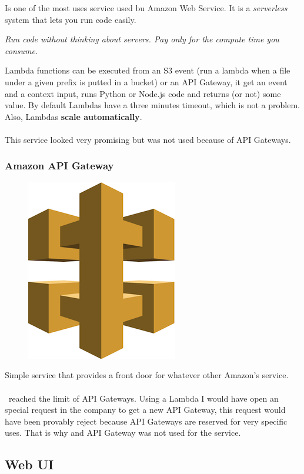 Is one of the most uses service used bu Amazon Web Service. It is a \textit{serverless} system that lets you run code easily.

\begin{displayquote}
\textit{Run code without thinking about servers. Pay only for the compute time you consume.}
\end{displayquote}

Lambda functions can be executed from an S3 event (run a lambda when a file under a given prefix is putted in a bucket) or an API Gateway, it get an event and a context input, runs Python\cite{python} or Node.js\cite{nodejs} code and returns (or not) some value. By default Lambdas have a three minutes timeout, which is not a problem. Also, Lambdas \textbf{scale automatically}.
\\\\
This service looked very promising but was not used because of API Gateways.

\subsubsection{Amazon API Gateway}

\begin{figure}[H]
\includegraphics[scale=0.2]{resources/api-logo.png}
\end{figure}

Simple service that provides a front door for whatever other Amazon's service.
\\\\
\company\ reached the limit of API Gateways. Using a Lambda I would have open an special request in the company to get a new API Gateway, this request would have been provably reject because API Gateways are reserved for very specific uses. That is why  and API Gateway was not used for the service.

\subsection{Web UI}



